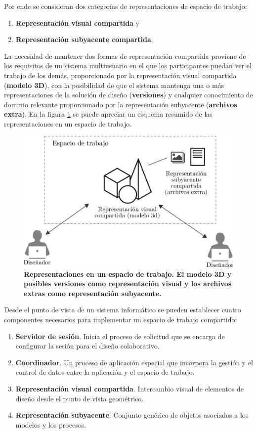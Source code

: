 Por ende se consideran dos categorías de representaciones de espacio de trabajo:

\begin{enumerate}
    \item \textbf{Representación visual compartida} y
    \item \textbf{Representación subyacente compartida}.
\end{enumerate}
La necesidad de mantener dos formas de representación compartida proviene de los requisitos de un sistema multiusuario en el que los participantes puedan ver el trabajo de los demás, proporcionado por la representación visual compartida (\textbf{modelo 3D}), con la posibilidad de que el sistema mantenga una o más representaciones de la solución de diseño (\textbf{versiones}) y cualquier conocimiento de dominio relevante proporcionado por la representación subyacente (\textbf{archivos extra}). En la figura \ref{fig:sistemashared} se puede apreciar un esquema resumido de las representaciones en un espacio de trabajo.

\begin{figure}[h]
\includegraphics[width=12cm]{Img/CPD/cad-shared.png}
\centering
\caption{\textbf{\footnotesize{Representaciones en un espacio de trabajo. El modelo 3D y posibles versiones como representación visual y los archivos extras como representación subyacente.}}}
\label{fig:sistemashared}
\end{figure}

Desde el punto de vista de un sistema informático se pueden establecer cuatro componentes necesarios para implementar un espacio de trabajo compartido:

\begin{enumerate}
    \item \textbf{Servidor de sesión}. Inicia el proceso de solicitud que se encarga de configurar la sesión para el diseño colaborativo.
    \item \textbf{Coordinador}. Un proceso de aplicación especial que incorpora la gestión y el control de datos entre la aplicación y el espacio de trabajo.
    \item \textbf{Representación visual compartida}. Intercambio visual de elementos de diseño desde el punto de vista geométrico.
    \item \textbf{Representación subyacente}. Conjunto genérico de objetos asociados a los modelos y los procesos.
\end{enumerate}

